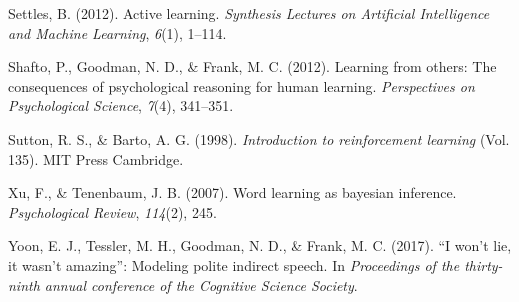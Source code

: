 \documentclass[10pt, letterpaper]{article}
\begin{document}
\hypertarget{ref-settles2012active}{}
Settles, B. (2012). Active learning. \emph{Synthesis Lectures on
Artificial Intelligence and Machine Learning}, \emph{6}(1), 1--114.

\hypertarget{ref-shafto2012learning}{}
Shafto, P., Goodman, N. D., \& Frank, M. C. (2012). Learning from
others: The consequences of psychological reasoning for human learning.
\emph{Perspectives on Psychological Science}, \emph{7}(4), 341--351.

\hypertarget{ref-sutton1998}{}
Sutton, R. S., \& Barto, A. G. (1998). \emph{Introduction to
reinforcement learning} (Vol. 135). MIT Press Cambridge.

\hypertarget{ref-xu2007}{}
Xu, F., \& Tenenbaum, J. B. (2007). Word learning as bayesian inference.
\emph{Psychological Review}, \emph{114}(2), 245.

\hypertarget{ref-yoon2017}{}
Yoon, E. J., Tessler, M. H., Goodman, N. D., \& Frank, M. C. (2017). ``I
won't lie, it wasn't amazing'': Modeling polite indirect speech. In
\emph{Proceedings of the thirty-ninth annual conference of the Cognitive
Science Society}.
\end{document}

